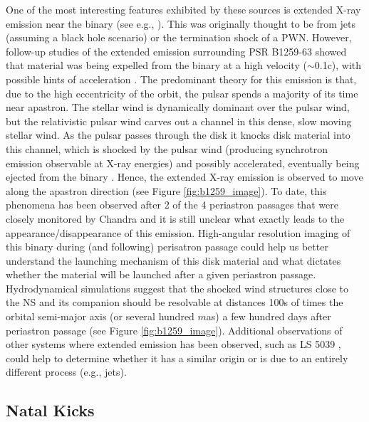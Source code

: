 \documentclass{article}
\begin{document}
One of the most interesting features exhibited by these sources is extended X-ray emission near the binary (see e.g., \cite{2011ApJ...735...58D,2011ApJ...730....2P}). This was originally thought to be from jets (assuming a black hole scenario) or the termination shock of a PWN. However, follow-up studies of the extended emission surrounding PSR B1259-63 showed that material was being expelled from the binary at a high velocity ($\sim$0.1c), with possible hints of acceleration \cite{2015ApJ...806..192P,2019ApJ...882...74H}. The predominant theory for this emission is that, due to the high eccentricity of the orbit, the pulsar spends a majority of its time near apastron. The stellar wind is dynamically dominant over the pulsar wind, but the relativistic pulsar wind carves out a channel in this dense, slow moving stellar wind. As the pulsar passes through the disk it knocks disk material into this channel, which is shocked by the pulsar wind (producing synchrotron emission observable at X-ray energies) and possibly accelerated, eventually being ejected from the binary \cite{2015ApJ...806..192P,2016MNRAS.456L..64B,2019ApJ...882...74H}. Hence, the extended X-ray emission is observed to move along the apastron direction (see Figure \ref{fig:b1259_image}). To date, this phenomena has been observed after 2 of the 4 periastron passages that were closely monitored by Chandra \cite{2023ApJ...958....5H} and it is still unclear what exactly leads to the appearance/disappearance of this emission. High-angular resolution imaging of this binary during (and following) perisatron passage could help us better understand the launching mechanism of this disk material and what dictates whether the material will be launched after a given periastron passage. Hydrodynamical simulations suggest that the shocked wind structures close to the NS and its companion should be resolvable at distances 100s of times the orbital semi-major axis (or several hundred $m$as) a few hundred days after periastron passage (see Figure \ref{fig:b1259_image}). Additional observations of other systems where extended emission has been observed, such as LS 5039 \cite{2011ApJ...735...58D}, could help to determine whether it has a similar origin or is due to an entirely different process (e.g., jets). 

\subsection{Natal Kicks}
\label{sec:natal_kicks}
\end{document}
